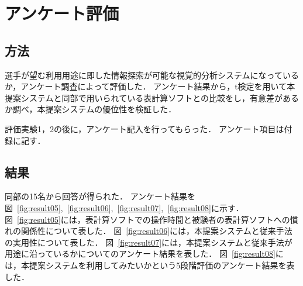 \documentclass[sotsuron]{kuee}
\begin{document}
	\section{アンケート評価}
		\subsection{方法}
			選手が望む利用用途に即した情報探索が可能な視覚的分析システムになっているか，アンケート調査によって評価した．
			アンケート結果から，t検定を用いて本提案システムと同部で用いられている表計算ソフトとの比較をし，有意差があるか調べ，本提案システムの優位性を検証した．
			
			評価実験1，2の後に，アンケート記入を行ってもらった．
			アンケート項目は付録に記す．
		\subsection{結果}
			同部の15名から回答が得られた．
			アンケート結果を図~\ref{fig:result05},~\ref{fig:result06},~\ref{fig:result07},~\ref{fig:result08}に示す．
			図~\ref{fig:result05}には，表計算ソフトでの操作時間と被験者の表計算ソフトへの慣れの関係性について表した．
			図~\ref{fig:result06}には，本提案システムと従来手法の実用性について表した．
			図~\ref{fig:result07}には，本提案システムと従来手法が用途に沿っているかについてのアンケート結果を表した．
			図~\ref{fig:result08}には，本提案システムを利用してみたいかという5段階評価のアンケート結果を表した．
			
\end{document}

